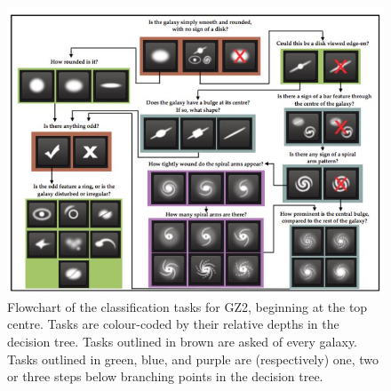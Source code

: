 \begin{figure}[h]
\centering
\includegraphics[scale=0.9]{figures/decision_tree.jpg}
\caption{Flowchart of the classification tasks for GZ2, beginning at the top centre. Tasks are colour-coded by their relative depths in the decision tree. Tasks outlined in brown are asked of every galaxy. Tasks outlined in green, blue, and purple are (respectively) one, two or three steps below branching points in the decision tree.}
\label{decision_tree}
\end{figure}